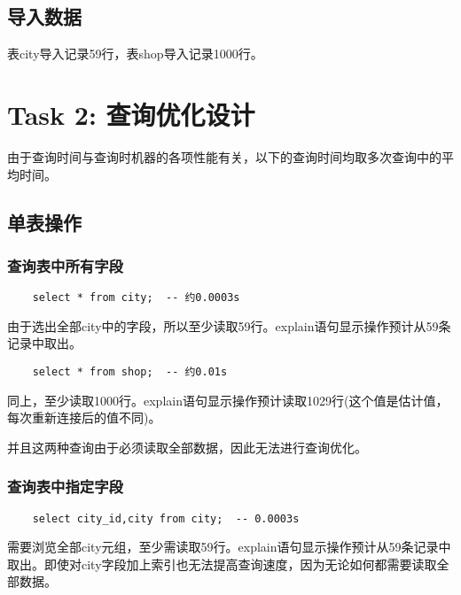 \documentclass[a4paper, 11pt, nofonts, nocap, fancyhdr]{ctexart}
\begin{document}
\subsection{导入数据}

表city导入记录59行，表shop导入记录1000行。



\section{Task 2: 查询优化设计}

由于查询时间与查询时机器的各项性能有关，以下的查询时间均取多次查询中的平均时间。

\lstset{numbers=none}

\subsection{单表操作}

\subsubsection{查询表中所有字段}

	\begin{lstlisting}
	select * from city;  -- 约0.0003s
	\end{lstlisting}

由于选出全部city中的字段，所以至少读取59行。explain语句显示操作预计从59条记录中取出。

	\begin{lstlisting}
	select * from shop;  -- 约0.01s
	\end{lstlisting}

同上，至少读取1000行。explain语句显示操作预计读取1029行(这个值是估计值，每次重新连接后的值不同)。

并且这两种查询由于必须读取全部数据，因此无法进行查询优化。
	
\subsubsection{查询表中指定字段}
	
	\begin{lstlisting}
	select city_id,city from city;  -- 0.0003s
	\end{lstlisting}

需要浏览全部city元组，至少需读取59行。explain语句显示操作预计从59条记录中取出。即使对city字段加上索引也无法提高查询速度，因为无论如何都需要读取全部数据。
	
\end{document}

